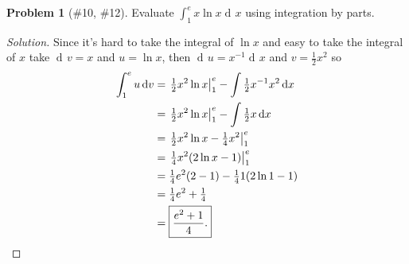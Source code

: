 \documentclass{article}
\theoremstyle{plain}
\theoremstyle{definition}
\newtheorem{problem}[exercise]{Problem}
\theoremstyle{remark}
\DeclareMathOperator{\diff}{d\!}
\begin{document}
\begin{problem}[{\color{Green}\#10}, {\color{Red}\#12}]
Evaluate $\int_1^e x\ln x\diff x$ using integration by parts.
\end{problem}
\begin{proof}[Solution]
Since it's hard to take the integral of $\ln x$ and easy to take the
integral of $x$ take $\diff v=x$ and $u=\ln x$, then $\diff u=x^{-1}\diff
x$ and $v=\tfrac{1}{2}x^2$ so
\begingroup
\allowdisplaybreaks
\begin{align*}
\int_1^e u\diff v
&=\left.\tfrac{1}{2}x^2\ln x\right|_1^e
-\int\tfrac{1}{2}x^{-1}x^2\diff x\\
&=\left.\tfrac{1}{2}x^2\ln x\right|_1^e
-\int\tfrac{1}{2}x\diff x\\
&=\left.\tfrac{1}{2}x^2\ln x-\tfrac{1}{4}x^2\right|_1^e\\
&=\left.\tfrac{1}{4}x^2(2\ln x-1)\right|_1^e\\
&=\tfrac{1}{4}e^2(2-1)-\tfrac{1}{4}1(2\ln 1-1)\\
&=\tfrac{1}{4}e^2+\tfrac{1}{4}\\
&=\boxed{\frac{e^2+1}{4}.}\qedhere
\end{align*}
\endgroup
\end{proof}
\end{document}
